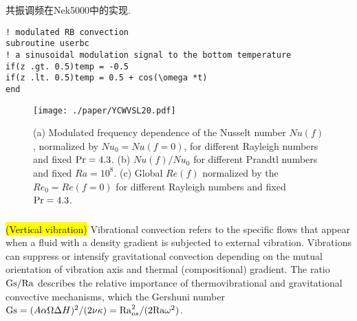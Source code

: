 \documentclass{hmj}
\newcommand\Pra{\mbox{\textrm{Pr}}} %
\newcommand\Ra{\mbox{\textrm{Ra}}} %
\newcommand\Gs{\mbox{\textrm{Gs}}} %
\begin{document}
共振调频在Nek5000中的实现.
\begin{tcolorbox}[colback=black!5!white,colframe=white]
\begin{lstlisting}[frame=lrtb]
! modulated RB convection
subroutine userbc
! a sinusoidal modulation signal to the bottom temperature
if(z .gt. 0.5)temp = -0.5
if(z .lt. 0.5)temp = 0.5 + cos(\omega *t)
end
\end{lstlisting}
\end{tcolorbox}
 
\begin{figure}
  \centering
  \centering
  \texttt{[image: ./paper/YCWVSL20.pdf]}
  \renewcommand{\figurename}{Figure}
  \caption{(a) Modulated frequency dependence of the Nusselt number $Nu( f)$, normalized by $Nu_0 = Nu( f = 0)$, for different Rayleigh numbers and fixed $\Pra = 4.3$. (b) $Nu( f)/Nu_0$ for different Prandtl numbers and fixed $Ra = 10^8$. (c) Global $Re( f)$ normalized by the $Re_0 = Re( f = 0)$ for different Rayleigh numbers and fixed $\Pra = 4.3$.}
  \renewcommand{\figurename}{图}
\label{fig2}
\end{figure}

 
\subsubsection{\cite{Bouarab2019}}

\subsubsection{\cite{Mialdun2008}}
\hl{(Vertical vibration)} Vibrational convection refers to the specific flows that appear when a fluid with a density gradient is subjected to external vibration. Vibrations can suppress or intensify gravitational convection depending on the mutual orientation of vibration axis and thermal (compositional) gradient. {\color{red} The ratio $\Gs/\Ra$ describes the relative importance of thermovibrational and gravitational convective mechanisms, which the Gershuni  number $\Gs=(A\alpha\Omega\Delta H)^2/(2\nu\kappa)=\Ra_{os}^2/(2\Ra \omega^2)$.}
\end{document}

